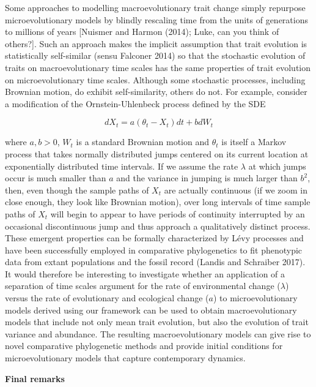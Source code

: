 \documentclass[]{article}
\begin{document}
Some approaches to modelling macroevolutionary trait change simply
repurpose microevolutionary models by blindly rescaling time from the
units of generations to millions of years {[}Nuismer and Harmon (2014);
Luke, can you think of others?{]}. Such an approach makes the implicit
assumption that trait evolution is statistically self-similar (sensu
Falconer 2014) so that the stochastic evolution of traits on
macroevolutionary time scales has the same properties of trait evolution
on microevolutionary time scales. Although some stochastic processes,
including Brownian motion, do exhibit self-similarity, others do not.
For example, consider a modification of the Ornstein-Uhlenbeck process
defined by the SDE

\begin{equation}
dX_t=a(\theta_t-X_t)dt+bdW_t
\end{equation}

where \(a,b>0\), \(W_t\) is a standard Brownian motion and \(\theta_t\)
is itself a Markov process that takes normally distributed jumps
centered on its current location at exponentially distributed time
intervals. If we assume the rate \(\lambda\) at which jumps occur is
much smaller than \(a\) and the variance in jumping is much larger than
\(b^2\), then, even though the sample paths of \(X_t\) are actually
continuous (if we zoom in close enough, they look like Brownian motion),
over long intervals of time sample paths of \(X_t\) will begin to appear
to have periods of continuity interrupted by an occasional discontinuous
jump and thus approach a qualitatively distinct process. These emergent
properties can be formally characterized by Lévy processes and have been
successfully employed in comparative phylogenetics to fit phenotypic
data from extant populations and the fossil record (Landis and Schraiber
2017). It would therefore be interesting to investigate whether an
application of a separation of time scales argument for the rate of
environmental change (\(\lambda\)) versus the rate of evolutionary and
ecological change (\(a\)) to microevolutionary models derived using our
framework can be used to obtain macroevolutionary models that include
not only mean trait evolution, but also the evolution of trait variance
and abundance. The resulting macroevolutionary models can give rise to
novel comparative phylogenetic methods and provide initial conditions
for microevolutionary models that capture contemporary dynamics.

\textbf{Final remarks}
\end{document}
